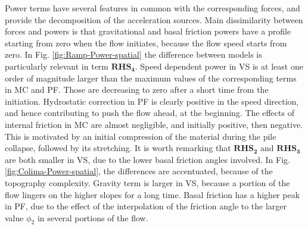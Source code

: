 \documentclass{article}
\begin{document}
Power terms have several features in common with the corresponding forces, and provide the decomposition of the acceleration sources. Main dissimilarity between forces and powers is that gravitational and basal friction powers have a profile starting from zero when the flow initiates, because the flow speed starts from zero. In Fig. \ref{fig:Ramp-Power-spatial} the difference between models is particularly relevant in term  $\boldsymbol{RHS_4}$. Speed dependent power in VS is at least one order of magnitude larger than the maximum values of the corresponding terms in MC and PF. Those are decreasing to zero after a short time from the initiation. Hydrostatic correction in PF is clearly positive in the speed direction, and hence contributing to push the flow ahead, at the beginning. The effects of internal friction in MC are almost negligible, and initially positive, then negative. This is motivated by an initial compression of the material during the pile collapse, followed by its stretching. It is worth remarking that $\boldsymbol{RHS_2}$ and $\boldsymbol{RHS_3}$ are both smaller in VS, due to the lower basal friction angles involved. In Fig. \ref{fig:Colima-Power-spatial}, the differences are accentuated, because of the topography complexity. Gravity term is larger in VS, because a portion of the flow lingers on the higher slopes for a long time. Basal friction has a higher peak in PF, due to the effect of the interpolation of the friction angle to the larger value $\phi_2$ in several portions of the flow.
\end{document}
